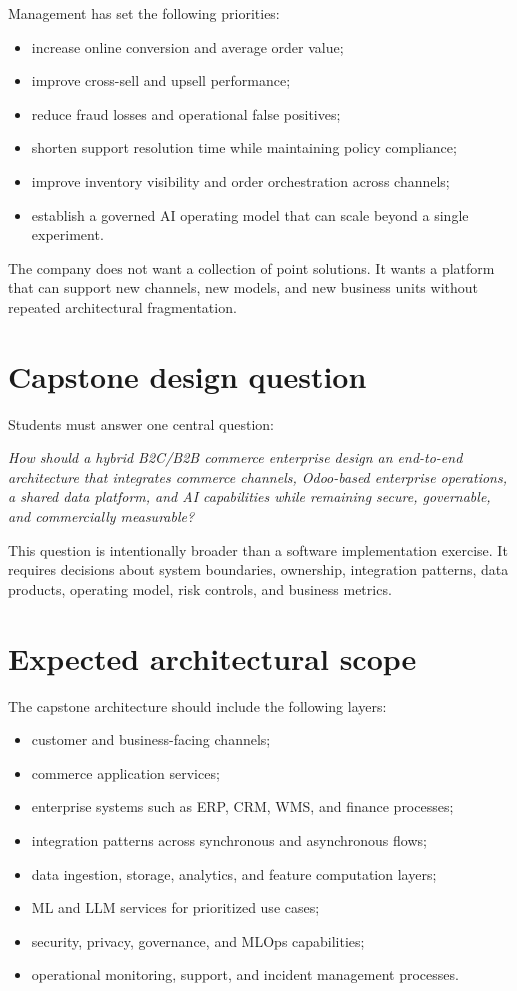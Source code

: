 Management has set the following priorities:
\begin{itemize}
  \item increase online conversion and average order value;
  \item improve cross-sell and upsell performance;
  \item reduce fraud losses and operational false positives;
  \item shorten support resolution time while maintaining policy compliance;
  \item improve inventory visibility and order orchestration across channels;
  \item establish a governed AI operating model that can scale beyond a single experiment.
\end{itemize}

The company does not want a collection of point solutions. It wants a platform that can support new channels, new models, and new business units without repeated architectural fragmentation.

\section{Capstone design question}
Students must answer one central question:

\emph{How should a hybrid B2C/B2B commerce enterprise design an end-to-end architecture that integrates commerce channels, Odoo-based enterprise operations, a shared data platform, and AI capabilities while remaining secure, governable, and commercially measurable?}

This question is intentionally broader than a software implementation exercise. It requires decisions about system boundaries, ownership, integration patterns, data products, operating model, risk controls, and business metrics.

\section{Expected architectural scope}
The capstone architecture should include the following layers:
\begin{itemize}
  \item customer and business-facing channels;
  \item commerce application services;
  \item enterprise systems such as ERP, CRM, WMS, and finance processes;
  \item integration patterns across synchronous and asynchronous flows;
  \item data ingestion, storage, analytics, and feature computation layers;
  \item ML and LLM services for prioritized use cases;
  \item security, privacy, governance, and MLOps capabilities;
  \item operational monitoring, support, and incident management processes.
\end{itemize}

